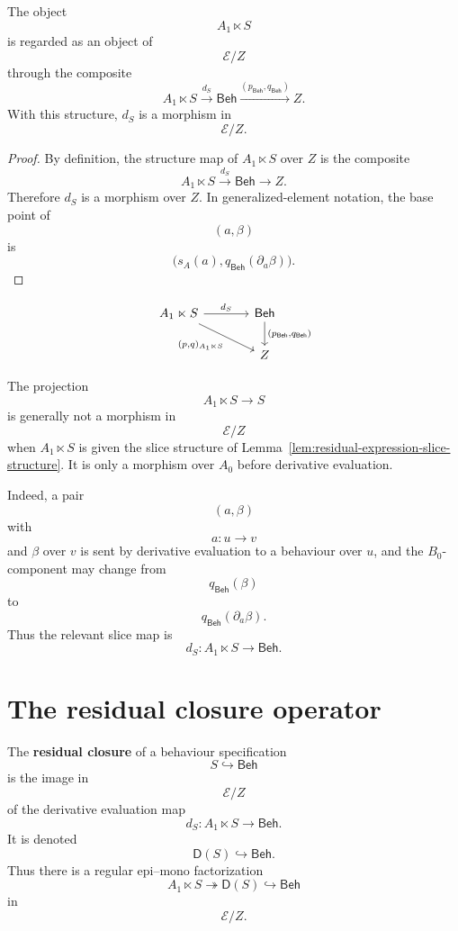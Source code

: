 \begin{lemma}
\label{lem:residual-expression-slice-structure}
The object
\[
A_1\ltimes S
\]
is regarded as an object of
\[
\mathcal E/Z
\]
through the composite
\[
A_1\ltimes S
\xrightarrow{d_S}
\mathsf{Beh}
\xrightarrow{(p_{\mathsf{Beh}},q_{\mathsf{Beh}})}
Z.
\]
With this structure, \(d_S\) is a morphism in
\[
\mathcal E/Z.
\]
\end{lemma}

\begin{proof}
By definition, the structure map of \(A_1\ltimes S\) over \(Z\) is the
composite
\[
A_1\ltimes S
\xrightarrow{d_S}
\mathsf{Beh}
\to
Z.
\]
Therefore \(d_S\) is a morphism over \(Z\). In generalized-element notation,
the base point of
\[
(a,\beta)
\]
is
\[
\bigl(s_A(a),q_{\mathsf{Beh}}(\partial_a\beta)\bigr).
\]
\end{proof}

\[
\begin{tikzcd}[column sep=large]
A_1\ltimes S
\arrow[r, "d_S"]
\arrow[dr, "{(p,q)_{A_1\ltimes S}}"']
&
\mathsf{Beh}
\arrow[d, "{(p_{\mathsf{Beh}},q_{\mathsf{Beh}})}"]
\\
&
Z
\end{tikzcd}
\]

\begin{remark}
\label{rem:projection-not-slice-map}
The projection
\[
A_1\ltimes S\to S
\]
is generally not a morphism in
\[
\mathcal E/Z
\]
when \(A_1\ltimes S\) is given the slice structure of
Lemma~\ref{lem:residual-expression-slice-structure}. It is only a morphism
over \(A_0\) before derivative evaluation.

Indeed, a pair
\[
(a,\beta)
\]
with
\[
a:u\to v
\]
and \(\beta\) over \(v\) is sent by derivative evaluation to a behaviour over
\(u\), and the \(B_0\)-component may change from
\[
q_{\mathsf{Beh}}(\beta)
\]
to
\[
q_{\mathsf{Beh}}(\partial_a\beta).
\]
Thus the relevant slice map is
\[
d_S:A_1\ltimes S\to\mathsf{Beh}.
\]
\end{remark}

\section{The residual closure operator}
\label{sec:residual-closure-operator}

\begin{definition}
\label{def:residual-closure}
The \textbf{residual closure} of a behaviour specification
\[
S\hookrightarrow\mathsf{Beh}
\]
is the image in
\[
\mathcal E/Z
\]
of the derivative evaluation map
\[
d_S:A_1\ltimes S\to\mathsf{Beh}.
\]
It is denoted
\[
\mathsf D(S)\hookrightarrow\mathsf{Beh}.
\]
Thus there is a regular epi--mono factorization
\[
A_1\ltimes S
\twoheadrightarrow
\mathsf D(S)
\hookrightarrow
\mathsf{Beh}
\]
in
\[
\mathcal E/Z.
\]
\end{definition}


